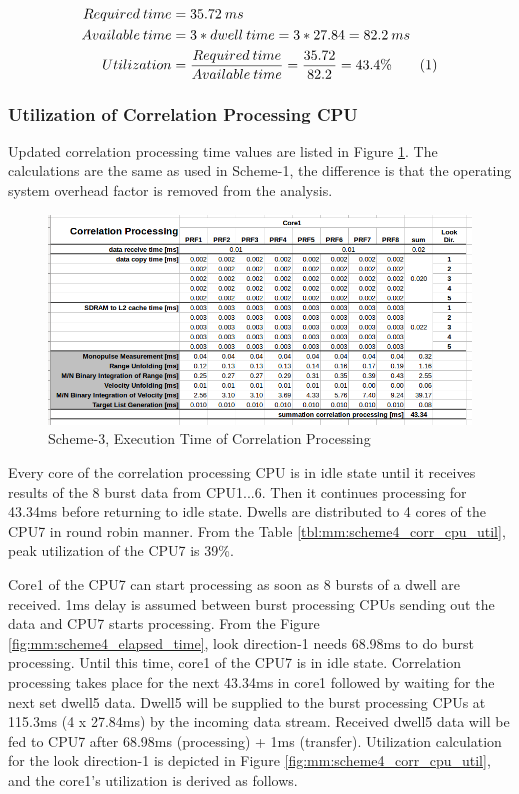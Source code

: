 \begin{align*}
	Required \: time &= 35.72 \: ms \\
	Available \: time &= 3 * dwell \: time = 3 * 27.84 = 82.2\: ms \\
	Utilization &= \frac{Required \: time}{Available \: time} = \frac{35.72}{82.2} = 43.4\% \stepcounter{equation}\tag{\theequation}
\end{align*}

\clearpage
\subsubsection{Utilization of Correlation Processing CPU}
\label{mm:SSS:scheme4:corr_cpu_util}
Updated correlation processing time values are listed in Figure \ref{fig:mm:scheme4_corr_calc}. The calculations are the same as used in Scheme-1, the difference is that the operating system overhead factor is removed from the analysis.
\begin{figure}[h!]
	\centering
	\includegraphics[width=160mm]{figures/scheme4_corr_proc}
	\caption{Scheme-3, Execution Time of Correlation Processing}
	\label{fig:mm:scheme4_corr_calc}
\end{figure}

Every core of the correlation processing CPU is in idle state until it receives results of the 8 burst data from CPU1...6. Then it continues processing for 43.34ms before returning to idle state. Dwells are distributed to 4 cores of the CPU7 in round robin manner. From the Table \ref{tbl:mm:scheme4_corr_cpu_util}, peak utilization of the CPU7 is 39\%. 

Core1 of the CPU7 can start processing as soon as 8 bursts of a dwell are received. 1ms delay is assumed between burst processing CPUs sending out the data and CPU7 starts processing. From the Figure \ref{fig:mm:scheme4_elapsed_time}, look direction-1 needs 68.98ms to do burst processing. Until this time, core1 of the CPU7 is in idle state. Correlation processing takes place for the next 43.34ms in core1 followed by waiting for the next set dwell5 data. Dwell5 will be supplied to the burst processing CPUs at 115.3ms (4 x 27.84ms) by the incoming data stream. Received dwell5 data will be fed to CPU7 after 68.98ms (processing) + 1ms (transfer). Utilization calculation for the look direction-1 is depicted in Figure \ref{fig:mm:scheme4_corr_cpu_util}, and the core1's utilization is derived as follows.

